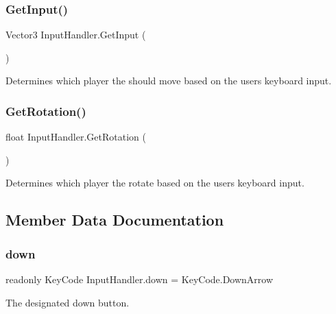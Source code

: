 \subsubsection{\texorpdfstring{Get\+Input()}{GetInput()}}
{\footnotesize\ttfamily Vector3 Input\+Handler.\+Get\+Input (\begin{DoxyParamCaption}{ }\end{DoxyParamCaption})\hspace{0.3cm}{\ttfamily [inline]}}



Determines which player the should move based on the user\textquotesingle{}s keyboard input. 

\mbox{\label{class_input_handler_a92d09579129aab7376cb6a650997cdbb}} 
\subsubsection{\texorpdfstring{Get\+Rotation()}{GetRotation()}}
{\footnotesize\ttfamily float Input\+Handler.\+Get\+Rotation (\begin{DoxyParamCaption}{ }\end{DoxyParamCaption})\hspace{0.3cm}{\ttfamily [inline]}}



Determines which player the rotate based on the user\textquotesingle{}s keyboard input. 



\subsection{Member Data Documentation}
\mbox{\label{class_input_handler_a20c863bc703b4fa72d04418ce8e9f7b1}} 
\subsubsection{\texorpdfstring{down}{down}}
{\footnotesize\ttfamily readonly Key\+Code Input\+Handler.\+down = Key\+Code.\+Down\+Arrow}



The designated down button. 

